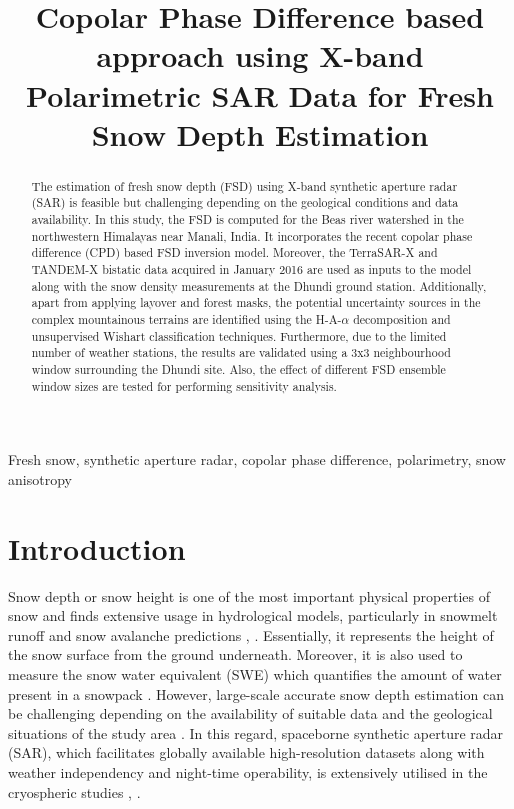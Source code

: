 \documentclass{article}
\title{Copolar Phase Difference based approach using X-band Polarimetric SAR Data for Fresh Snow Depth Estimation}
\begin{document}
%
\maketitle
\begin{abstract}

The estimation of fresh snow depth (FSD) using X-band synthetic aperture radar (SAR) is feasible but challenging depending on the geological conditions and data availability. In this study, the FSD is computed for the Beas river watershed in the northwestern Himalayas near Manali, India. It incorporates the recent copolar phase difference (CPD) based FSD inversion model. Moreover, the TerraSAR-X and TANDEM-X bistatic data acquired in January 2016 are used as inputs to the model along with the snow density measurements at the Dhundi ground station. Additionally, apart from applying layover and forest masks, the potential uncertainty sources in the complex mountainous terrains are identified using the H-A-$\alpha$ decomposition and unsupervised Wishart classification techniques. Furthermore, due to the limited number of weather stations, the results are validated using a 3x3 neighbourhood window surrounding the Dhundi site. Also, the effect of different FSD ensemble window sizes are tested for performing sensitivity analysis.
\end{abstract}
%
\begin{keywords}
Fresh snow, synthetic aperture radar, copolar phase difference, polarimetry, snow anisotropy
\end{keywords}
%
\section{Introduction}
\label{sec:intro}
Snow depth or snow height is one of the most important physical properties of snow and finds extensive usage in hydrological models, particularly in snowmelt runoff and snow avalanche predictions \cite{Thakur2012}, \cite{Tedesco2015}. Essentially, it represents the height of the snow surface from the ground underneath. Moreover, it is also used to measure the snow water equivalent (SWE) which quantifies the amount of water present in a snowpack \cite{Tedesco2015}. However, large-scale accurate snow depth estimation can be challenging depending on the availability of suitable data and the geological situations of the study area \cite{Leinss2014}. In this regard, spaceborne synthetic aperture radar (SAR), which facilitates globally available high-resolution datasets along with weather independency and night-time operability, is extensively utilised in the cryospheric studies \cite{Thakur2012}, \cite{Leinss2014}.
\end{document}
